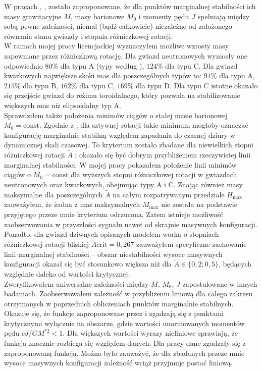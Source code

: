 \documentclass{bachelor_thesis}
\begin{document}
        \indent W pracach \cite{Breu2016}, \cite{Bozzola2018}, \cite{Weih2018} zostało zaproponowane, że dla punktów marginalnej stabilności ich masy grawitacyjne $M$, masy barionowe $M_0$ i momenty pędu $J$ spełniają między sobą pewne zależności, niemal (bądź całkowicie) niezależne od założonego równania stanu gwiazdy i stopnia różniczkowej rotacji.\\
        \indent W ramach mojej pracy licencjackiej wyznaczyłem możliwe wzrosty masy zapewniane przez różniczkową rotację. Dla gwiazd neutronowych wyniosły one odpowiednio $80 \%$ dla typu A (typy według \citealp{Ansorg2009}), $124 \%$ dla typu C. Dla gwiazd kwarkowych największe skoki mas dla poszczególnych typów to: $91\%$ dla typu A, $215\%$ dla typu B, $162 \%$ dla typu C, $169\%$ dla typu D. Dla typu C istotne okazało się przejście gwiazd do reżimu toroidalnego, który pozwala na stabilizowanie większych mas niż elipsoidalny typ A.\\
        \indent Sprawdziłem także położenia minimów ciągów o stałej masie barionowej $M_0=\textrm{const}$. Zgodnie z \cite{Friedman1988}, dla sztywnej rotacji takie minimum mogłoby oznaczać konfigurację marginalnie stabilną względem zapadania do czarnej dziury w dynamicznej skali czasowej. To kryterium zostało zbadane dla niewielkich stopni różniczkowej rotacji $\tilde{A}$ i okazało się być dobrym przybliżeniem rzeczywistej linii marginalnej stabilności. W mojej pracy pokazałem położenie linii minimów ciągów o $M_0=\textrm{const}$ dla wyższych stopni różniczkowej rotacji w gwiazdach neutronowych oraz kwarkowych, obejmując typy A i C. Znając również masy maksymalne dla poszczególnych $\tilde{A}$ na całym rozpatrywanym przedziale $H_\textrm{max}$ zauważyłem, że żadna z mas maksymalnych $M_\textrm{max}$ nie została na podstawie przyjętego przeze mnie kryterium odrzucona. Zatem istnieje możliwość zaobserwowania w przyszłości sygnału nawet od skrajnie masywnych konfiguracji. Ponadto, dla gwiazd dziwnych opisanych modelem worka o stopniach różniczkowej rotacji bliskiej $\tilde{A}\textrm{crit}=0,267$ zauważyłem specyficzne zachowanie linii marginalnej stabilności -- obszar niestabilności wysoce masywnych konfiguracji okazał się być stosunkowo większa niż dla $\tilde{A}\in\{0,2;0,5\}$, będących względnie daleko od wartości krytycznej.\\
        \indent Zweryfikowałem uniwersalne zależności między $M$, $M_0$, $J$ zapostulowane w innych badaniach. Zaobserwowałem zależność w przybliżeniu liniową dla całego zakresu otrzymanych w poprzednich obliczeniach punktów marginalnie stabilnych. Okazuje się, że funkcje zaproponowane przez \cite{Breu2016} i \cite{Bozzola2018} zgadzają się z punktami krytycznymi wyłącznie na obszarze, gdzie wartości unormowanych momentów pędu $cJ/GM^{*2}<1$. Dla większych wartości wyrazy nieliniowe sprawiają, że funkcja znacznie rozbiega się względem danych. Dla pracy \cite{Weih2018} dane zgadzały się z zaproponowaną funkcją. Można było zauważyć, że dla zbadanych przeze mnie wysoce masywnych konfiguracji zależność wciąż przyjmuje postać liniową.
    
    

    \listoffigures
\end{document}
